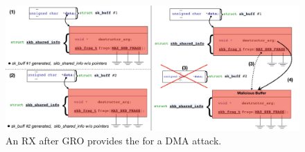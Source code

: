 
\begin{figure}[t]
    \centering
    \includegraphics[width=\linewidth]{figs/gro.pdf}
    \caption{An RX \skb{} after GRO provides the \kva{} for a DMA attack.}
    \label{fig:gro_xdp}
\end{figure}






